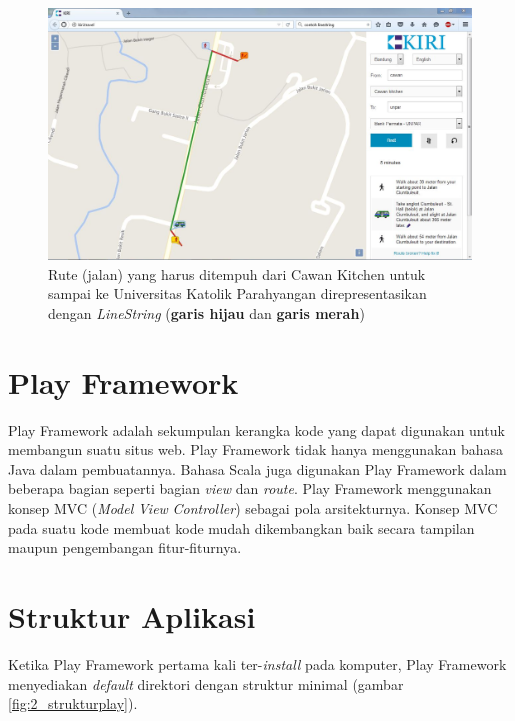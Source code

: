 \begin{figure}[htbp]
	\centering
		\includegraphics[scale=0.4]{Gambar/2_LineString.JPG}
	\caption{Rute (jalan) yang harus ditempuh dari Cawan Kitchen untuk sampai ke Universitas Katolik Parahyangan direpresentasikan dengan \textit{LineString} (\textbf{garis hijau} dan \textbf{garis merah})}
	\label{fig:2_linestring}
\end{figure}

\section{Play Framework}
\label{sec:play_framework}
Play Framework adalah sekumpulan kerangka kode yang dapat digunakan untuk membangun suatu situs web. Play Framework tidak hanya menggunakan bahasa Java dalam pembuatannya. Bahasa Scala juga digunakan Play Framework dalam beberapa bagian seperti bagian \textit{view} dan \textit{route}\cite{playforjava}. Play Framework menggunakan konsep MVC (\textit{Model} \textit{View} \textit{Controller}) sebagai pola arsitekturnya. Konsep MVC pada suatu kode membuat kode mudah dikembangkan baik secara tampilan maupun pengembangan fitur-fiturnya.

\section{Struktur Aplikasi}
\label{sec:struktur_aplikasi}
Ketika Play Framework pertama kali ter-\textit{install} pada komputer, Play Framework menyediakan \textit{default} direktori dengan struktur minimal (gambar \ref{fig:2_strukturplay}).

